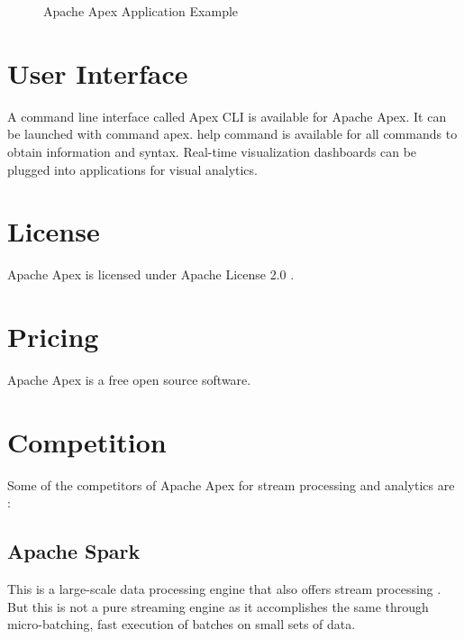 \documentclass[9pt,twocolumn,twoside]{../../styles/osajnl}
\begin{document}
\begin{figure}[ht!]
\centering
{}
\caption{Apache Apex Application Example \cite{www-apacheapexblog}}
\label{fig:Apache Apex Application Example}
\end{figure}
\section{User Interface}
A command line interface called Apex CLI is available for Apache Apex.
It can be launched with command  apex.
help command is available for all commands to obtain information and syntax.
Real-time visualization dashboards can be plugged into applications for visual analytics.


\section{License}
Apache Apex is licensed under Apache License 2.0 \cite{www-apacheapexsite}.  

\section{Pricing}
Apache Apex is a free open source software.
\section{Competition}
Some of the competitors of Apache Apex for stream processing and analytics are \cite{www-apacheapexcompetition}:
\subsection{Apache Spark}
 This is a large-scale data processing engine that also offers stream processing \cite{www-apachesparksite}. But this is not a pure streaming engine as it accomplishes the same through micro-batching, fast execution of batches on small sets of data. 
\end{document}
